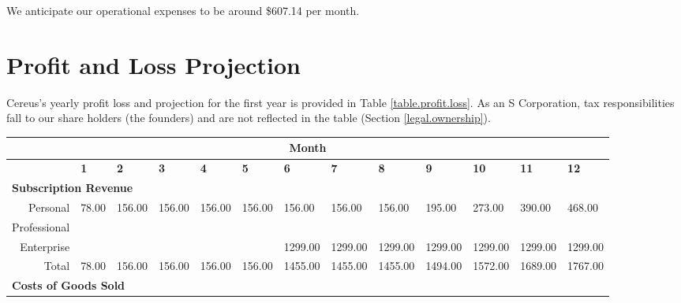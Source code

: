 We anticipate our operational expenses to be around \$607.14 per month.

\section{Profit and Loss Projection}

Cereus's yearly profit loss and projection for the first year is provided in Table \ref{table.profit.loss}. As an S Corporation, tax responsibilities fall to our share holders (the founders) and are not reflected in the table (Section \ref{legal.ownership}).


\begin{sidewaystable}
\begin{table}[H]
  \setlength\tabcolsep{5pt}
  \def\arraystretch{1.2}%

  \begin{tabularx}{\textwidth}{X X X X X X X X X X X X X}

    \multicolumn{13}{c}{\textbf{Month}} \\

    \hline
    
    \multicolumn{1}{c}{} & \textbf{1} & \textbf{2} & \textbf{3} & \textbf{4} & \textbf{5} & \textbf{6} & \textbf{7} & \textbf{8} & \textbf{9} & \textbf{10} & \textbf{11} & \textbf{12}  \\

    \hline

    \multicolumn{13}{l}{\textbf{Subscription Revenue}} \\

    \hline

    \multicolumn{1}{r}{Personal} & 78.00 & 156.00 & 156.00 & 156.00  & 156.00  & 156.00  & 156.00  & 156.00  & 195.00  & 273.00  & 390.00  & 468.00  \\
    \multicolumn{1}{r}{Professional} &   &   &  &   &  &  &  &  &  &  &  &  \\
    \multicolumn{1}{r}{Enterprise} &  &  &  &  &  & 1299.00 & 1299.00 & 1299.00 & 1299.00 & 1299.00 & 1299.00 & 1299.00  \\

    \multicolumn{1}{r}{Total} & 78.00 & 156.00 & 156.00 & 156.00  & 156.00  & 1455.00  & 1455.00  & 1455.00  & 1494.00  & 1572.00  & 1689.00  & 1767.00  \\

    \hline

    \multicolumn{13}{l}{\textbf{Costs of Goods Sold}} \\


\end{tabularx}
\end{table}
\end{sidewaystable}
